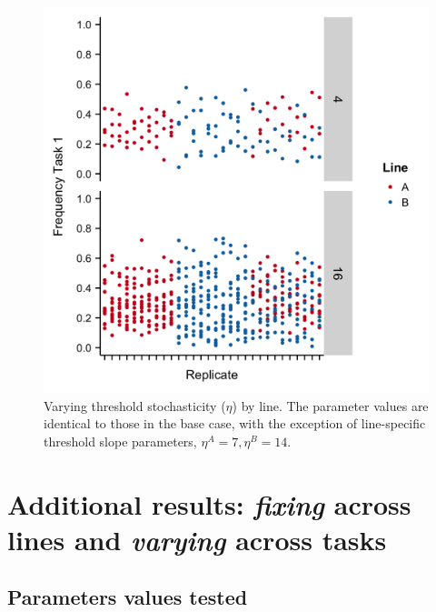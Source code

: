 \documentclass[11pt]{article}
\begin{document}
\begin{appendices}
\begin{figure}[H]
	\centering
	\includegraphics[width=.4\linewidth]{Diff_Etas_HighB.png}
	\caption{Varying threshold stochasticity ($\eta$) by line. The parameter values are identical to those in the base case, with the exception of line-specific threshold slope parameters, $\eta^A = 7, \eta^B = 14$.} 
	\label{fig:varyetaAB}
\end{figure}

\section{Additional results: \textit{fixing} across lines and \textit{varying} across tasks}

\subsection{Parameters values tested}


\end{appendices}
\end{document}
